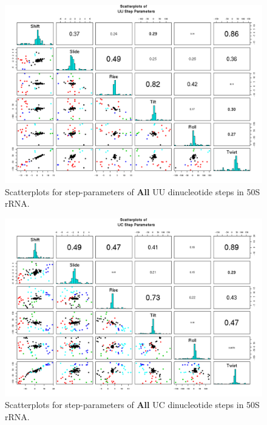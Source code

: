 \begin{figure}[H]
\centering
\includegraphics[angle=90, scale=0.6]{All/UU.png}
\caption{Scatterplots for step-parameters of \textbf{All} UU dinucleotide steps
in 50S rRNA.}
\label{fig:stepsUU}
\end{figure}

\begin{figure}[H]
\centering
\includegraphics[angle=90, scale=0.6]{All/UC.png}
\caption{Scatterplots for step-parameters of \textbf{All} UC dinucleotide steps
in 50S rRNA.}
\label{fig:stepsUC}
\end{figure}

